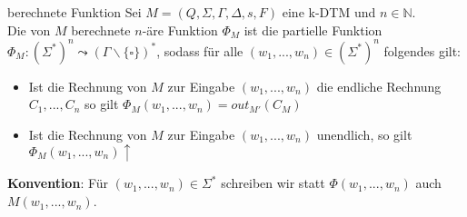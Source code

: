 \begin{defn}{berechnete Funktion}
    Sei $M = (Q, \Sigma, \Gamma, \Delta, s, F)$ eine k-DTM und $n \in \mathbb{N}$. \\

    Die von $M$ berechnete $n$-äre Funktion $\Phi_M$ ist die partielle Funktion \\
    $\Phi_M : (\Sigma^*)^n \leadsto (\Gamma\backslash\{\square\})^*$,
    sodass für alle $(w_1,...,w_n) \in (\Sigma^*)^n$ folgendes gilt: \\

    \begin{itemize}
        \item Ist die Rechnung von $M$ zur Eingabe $(w_1,...,w_n)$ die endliche Rechnung $C_1,...,C_n$ so gilt $\Phi_M(w_1,...,w_n)=out_{M'}(C_M)$
        \item Ist die Rechnung von $M$ zur Eingabe $(w_1,...,w_n)$ unendlich, so gilt $\Phi_M(w_1,...,w_n)\uparrow$
    \end{itemize}

    \textbf{Konvention}: Für $(w_1,...,w_n) \in \Sigma^*$ schreiben wir statt $\Phi(w_1,...,w_n)$ auch $M(w_1,...,w_n)$.
\end{defn}
